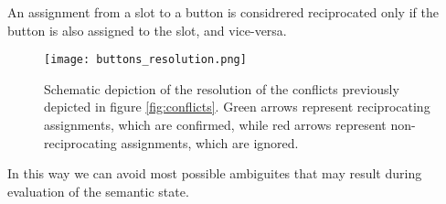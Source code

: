 An assignment from a slot to a button is considrered reciprocated only if the button is also assigned to the slot, and vice-versa.

\begin{figure}[ht]
    \texttt{[image: buttons\_resolution.png]}
    \caption{Schematic depiction of the resolution of the conflicts previously depicted in figure \ref{fig:conflicts}. Green arrows represent reciprocating assignments, which are confirmed, while red arrows represent non-reciprocating assignments, which are ignored.}
    \label{fig:resolution}
\end{figure}

In this way we can avoid most possible ambiguites that may result during evaluation of the semantic state.


